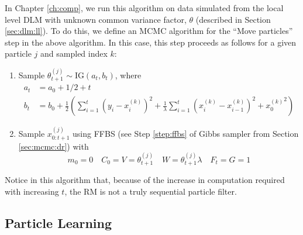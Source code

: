 In Chapter \ref{ch:comp}, we run this algorithm on data simulated from the local level DLM with unknown common variance factor, $\theta$ (described in Section \ref{sec:dlm:ll}). To do this, we define an MCMC algorithm for the ``Move particles'' step in the above algorithm. In this case, this step proceeds as follows for a given particle $j$ and sampled index $k$:
\begin{enumerate}
\item \label{step:move:ll} Sample $\theta^{(j)}_{t+1} \sim \mbox{IG}(a_t, b_t)$, where
\begin{align*}
a_t &= a_0 + 1/2 + t \\
b_t &= b_0 + \frac{1}{2}\left(\sum_{i=1}^t (y_i - x_i^{(k)})^2 + \frac{1}{\lambda}\sum_{i=1}^t (x_i^{(k)} - x_{i-1}^{(k)})^2 + {x^{(k)}_0}^2\right)
\end{align*}
\item Sample $x_{0:t+1}^{(j)}$ using FFBS (see Step \ref{step:ffbs} of Gibbs sampler from Section \ref{sec:mcmc:dr}) with
\[m_0 = 0 \quad C_0 = V = \theta^{(j)}_{t+1} \quad W = \theta_{t+1}^{(j)}\lambda \quad F_t = G = 1\]
\end{enumerate}
Notice in this algorithm that, because of the increase in computation required with increasing $t$, the RM is not a truly sequential particle filter.

\subsection{Particle Learning \label{sec:pl}}

